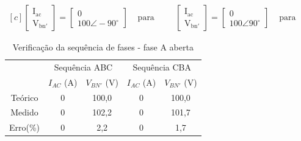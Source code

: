 \documentclass[a4paper,12pt,oneside,openany,table,xcdraw]{article}
\begin{document}
\begin{equation*}
\begin{aligned}[c]
\mathrm{\begin{bmatrix}
I_{ac}\\
V_{bn'}
\end{bmatrix}} =\mathrm{\begin{bmatrix}
0\\
100\angle -90\mathrm{^{\circ }}
\end{bmatrix}} & \text{ \ para ABC e} & \mathrm{\begin{bmatrix}
I_{ac}\\
V_{bn'}
\end{bmatrix}} =\mathrm{\begin{bmatrix}
0\\
100\angle 90\mathrm{^{\circ }}
\end{bmatrix}} & \text{ \ para CBA.}
\end{aligned}
\end{equation*}

\vspace{0.6cm}
\begin{table}[H]
\centering \small {}
\caption{Verificação da sequência de fases - fase A aberta}
\label{m2:dados}
\begin{tabular}{c|c|c|c|c|}
\cline{2-5}
\multicolumn{1}{l|}{} & \multicolumn{2}{c|}{Sequência ABC} & \multicolumn{2}{c|}{Sequência CBA} \\ \cline{2-5} 
 & $I_{AC}$ (A) & $V_{BN'}$ (V) & $I_{AC}$ (A) & $V_{BN'}$ (V) \\ \hline
\multicolumn{1}{|c|}{Teórico} & 0 & 100,0 & 0 & 100,0 \\ \hline
\multicolumn{1}{|c|}{Medido} & 0 & 102,2 & 0 & 101,7 \\ \hline
\multicolumn{1}{|c|}{Erro(\%)} & 0 & 2,2 & 0 & 1,7 \\ \hline
\end{tabular}
\end{table}
\vspace{0.3cm}
\end{document}
